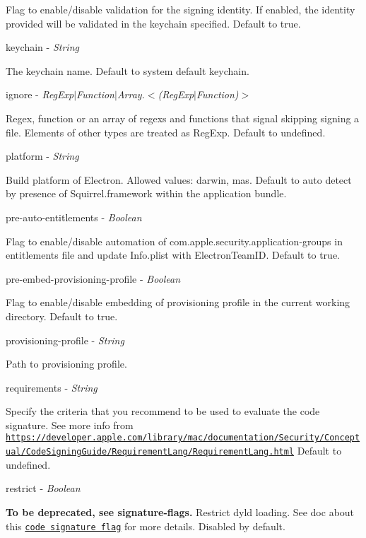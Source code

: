 Flag to enable/disable validation for the signing identity. If enabled, the {\ttfamily identity} provided will be validated in the {\ttfamily keychain} specified. Default to {\ttfamily true}.

{\ttfamily keychain} -\/ {\itshape String}

The keychain name. Default to system default keychain.

{\ttfamily ignore} -\/ {\itshape Reg\+Exp$\vert$\+Function$\vert$\+Array.$<$(Reg\+Exp$\vert$\+Function)$>$}

Regex, function or an array of regex\textquotesingle{}s and functions that signal skipping signing a file. Elements of other types are treated as {\ttfamily Reg\+Exp}. Default to {\ttfamily undefined}.

{\ttfamily platform} -\/ {\itshape String}

Build platform of Electron. Allowed values\+: {\ttfamily darwin}, {\ttfamily mas}. Default to auto detect by presence of {\ttfamily Squirrel.\+framework} within the application bundle.

{\ttfamily pre-\/auto-\/entitlements} -\/ {\itshape Boolean}

Flag to enable/disable automation of {\ttfamily com.\+apple.\+security.\+application-\/groups} in entitlements file and update {\ttfamily Info.\+plist} with {\ttfamily Electron\+Team\+ID}. Default to {\ttfamily true}.

{\ttfamily pre-\/embed-\/provisioning-\/profile} -\/ {\itshape Boolean}

Flag to enable/disable embedding of provisioning profile in the current working directory. Default to {\ttfamily true}.

{\ttfamily provisioning-\/profile} -\/ {\itshape String}

Path to provisioning profile.

{\ttfamily requirements} -\/ {\itshape String}

Specify the criteria that you recommend to be used to evaluate the code signature. See more info from \href{https://developer.apple.com/library/mac/documentation/Security/Conceptual/CodeSigningGuide/RequirementLang/RequirementLang.html}{\tt https\+://developer.\+apple.\+com/library/mac/documentation/\+Security/\+Conceptual/\+Code\+Signing\+Guide/\+Requirement\+Lang/\+Requirement\+Lang.\+html} Default to {\ttfamily undefined}.

{\ttfamily restrict} -\/ {\itshape Boolean}

{\bfseries To be deprecated, see {\ttfamily signature-\/flags}.} Restrict dyld loading. See doc about this \href{https://developer.apple.com/documentation/security/seccodesignatureflags/kseccodesignaturerestrict?language=objc}{\tt code signature flag} for more details. Disabled by default.

